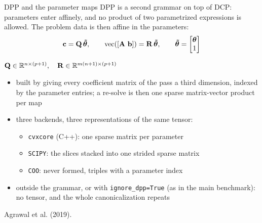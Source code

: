 \documentclass[10pt,mathserif,aspectratio=169]{beamer}
\newcommand{\bul}{\setlength\itemsep{1.1ex}}
\begin{document}
\begin{frame}[label=bk-dpp]{DPP and the parameter maps}
\vspace{-0.5ex}
{\small DPP is a second grammar on top of DCP: parameters enter affinely, and no product of two
parametrized expressions is allowed. The problem data is then
{\color{polyblue}affine in the parameters}:}
\[
  \mathbf{c} = \mathbf{Q}\,\boldsymbol{\tilde\theta},
  \qquad
  \mathop{\mathrm{vec}}([\mathbf{A}\ \mathbf{b}]) = \mathbf{R}\,\boldsymbol{\tilde\theta},
  \qquad
  \boldsymbol{\tilde\theta} = \begin{bmatrix} \boldsymbol{\theta} \\ 1 \end{bmatrix}
\]
\vspace{-1ex}
\begin{center}\small
$\mathbf{Q} \in \mathbb{R}^{n \times (p+1)}, \quad \mathbf{R} \in \mathbb{R}^{m(n+1) \times (p+1)}$
\end{center}

\begin{itemize}\small\bul
  \item built by giving every coefficient matrix of the pass a third dimension, indexed by the
        parameter entries; a re-solve is then one sparse matrix-vector product per map
  \item three backends, three representations of the same tensor:
    \begin{itemize}\footnotesize
      \item[--] \texttt{cvxcore} (C++): one sparse matrix per parameter
      \item[--] \texttt{SCIPY}: the slices stacked into one strided sparse matrix
      \item[--] \texttt{COO}: never formed, triples with a parameter index
    \end{itemize}
  \item outside the grammar, or with \texttt{ignore\_dpp=True} (as in the main benchmark): no
        tensor, and the whole canonicalization repeats
\end{itemize}

\vfill
{\scriptsize\color{black!55} Agrawal et al. (2019).}
\end{frame}
\end{document}
